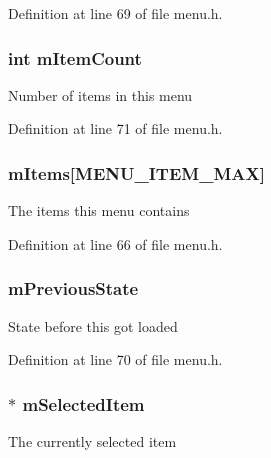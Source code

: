 Definition at line 69 of file menu.\+h.

\subsubsection[{\texorpdfstring{m\+Item\+Count}{mItemCount}}]{\setlength{\rightskip}{0pt plus 5cm}int m\+Item\+Count}\hypertarget{structmenu__s_a20f9c9276293cccf509c5102dad0698a}{}\label{structmenu__s_a20f9c9276293cccf509c5102dad0698a}
Number of items in this menu 

Definition at line 71 of file menu.\+h.

\subsubsection[{\texorpdfstring{m\+Items}{mItems}}]{ m\+Items\mbox{[}{\bf M\+E\+N\+U\+\_\+\+I\+T\+E\+M\+\_\+\+M\+AX}\mbox{]}}\hypertarget{structmenu__s_a0cc653a44ba5b3f6fc46b8c43131c18b}{}\label{structmenu__s_a0cc653a44ba5b3f6fc46b8c43131c18b}
The items this menu contains 

Definition at line 66 of file menu.\+h.

\subsubsection[{\texorpdfstring{m\+Previous\+State}{mPreviousState}}]{ m\+Previous\+State}\hypertarget{structmenu__s_a5caad79c0b16c966cdace805942e2592}{}\label{structmenu__s_a5caad79c0b16c966cdace805942e2592}
State before this got loaded 

Definition at line 70 of file menu.\+h.

\subsubsection[{\texorpdfstring{m\+Selected\+Item}{mSelectedItem}}]{$\ast$ m\+Selected\+Item}\hypertarget{structmenu__s_a02f9bbc347b039857ac927bfa84b66cf}{}\label{structmenu__s_a02f9bbc347b039857ac927bfa84b66cf}
The currently selected item 

